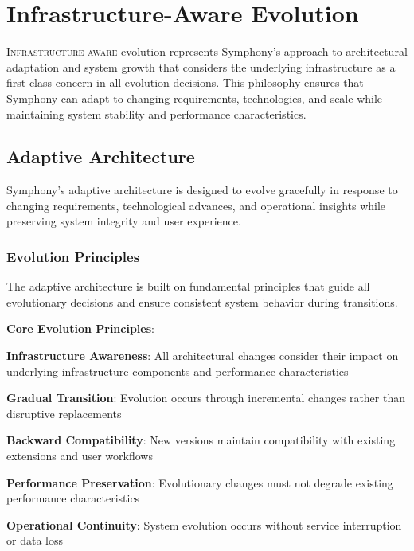 
\section*{Infrastructure-Aware Evolution}

\lettrine{I}{nfrastructure-aware} evolution represents Symphony's approach to architectural adaptation and system growth that considers the underlying infrastructure as a first-class concern in all evolution decisions. This philosophy ensures that Symphony can adapt to changing requirements, technologies, and scale while maintaining system stability and performance characteristics.

\subsection*{Adaptive Architecture}

Symphony's adaptive architecture is designed to evolve gracefully in response to changing requirements, technological advances, and operational insights while preserving system integrity and user experience.

\subsubsection*{Evolution Principles}

The adaptive architecture is built on fundamental principles that guide all evolutionary decisions and ensure consistent system behavior during transitions.

\textbf{Core Evolution Principles}:
\begin{expandedlist}
    \item \textbf{Infrastructure Awareness}: All architectural changes consider their impact on underlying infrastructure components and performance characteristics
    \item \textbf{Gradual Transition}: Evolution occurs through incremental changes rather than disruptive replacements
    \item \textbf{Backward Compatibility}: New versions maintain compatibility with existing extensions and user workflows
    \item \textbf{Performance Preservation}: Evolutionary changes must not degrade existing performance characteristics
    \item \textbf{Operational Continuity}: System evolution occurs without service interruption or data loss
\end{expandedlist}

